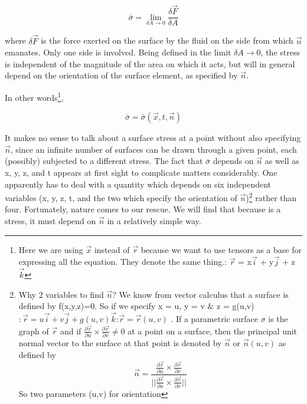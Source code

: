 \documentclass{article}
\begin{document}
{\begin{equation}
\bar{\sigma} = \lim_{\delta A \to 0} \frac{\delta \overrightarrow{F}}{\delta A} \label{e2}
\end{equation}

where $\delta \overrightarrow{F}$ is the force exerted on the surface by the fluid on the side from which $\overrightarrow{n}$ emanates. Only one side is involved. Being defined in the limit $\delta A  \to 0$, the stress is independent of the magnitude of the area on which it acts, but will in general depend on the orientation of the surface element, as specified by $\overrightarrow{n}$. 

In other words\footnote{Here we are using $\overrightarrow{x}$ instead of $\overrightarrow{r}$ because we want to use tensors as a base for expressing all the equation. They denote the same thing.: $\overrightarrow{r}$ = x$\overrightarrow{i}$ + y$\overrightarrow{j}$ + z $\overrightarrow{k}$},

\begin{equation}
\bar{\sigma} = \bar{\sigma}(\overrightarrow{x},t,\overrightarrow{n}) \label{e3}
\end{equation}

It makes no sense to talk about a surface stress at a point without also specifying $\overrightarrow{n}$, since an infinite number of surfaces can be drawn through a given point, each (possibly) subjected to a different stress. The fact that $\bar{\sigma}$ depends on $\overrightarrow{n}$ as well as x, y, z, and t appears at first sight to complicate matters considerably. One apparently has to deal with a quantity which depends on six independent variables (x, y, z, t, and the two which specify the orientation of $\overrightarrow{n}$)\footnote{Why 2 variables to find $\overrightarrow{n}$? We know from vector calculus that a surface is defined by f(x,y,z)=0. So if we specify x = u, y = v \& z = g(u,v) $: \overrightarrow{r} = u \overrightarrow{i} + v \overrightarrow{j} + g(u,v)\overrightarrow{k}$:$\overrightarrow{r} = \overrightarrow{r}(u,v)$ . If a parametric surface $\sigma$ is the graph of $\overrightarrow{r}$ and if $\frac{\partial \overrightarrow{r}}{\partial u}\times\frac{\partial \overrightarrow{r}}{\partial v} \neq 0$ at a point on a surface, then the principal unit normal vector to the surface at that point is denoted by $\overrightarrow{n}$ or $\overrightarrow{n}(u,v)$ as defined by $$\overrightarrow{n} = \frac{\frac{\partial \overrightarrow{r}}{\partial u}\times\frac{\partial \overrightarrow{r}}{\partial v}}{\vert\vert\frac{\partial \overrightarrow{r}}{\partial u}\times\frac{\partial \overrightarrow{r}}{\partial v}\vert\vert}$$ So two parameters (u,v) for orientation} rather than four. Fortunately, nature comes to our rescue. We will find that because is a stress, it must depend on $\overrightarrow{n}$ in a relatively simple way. 

}
\end{document}
